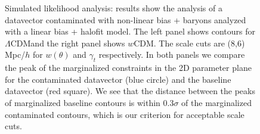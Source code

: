 \documentclass[fleqn,usenatbib]{mnras}
\newcommand{\lcdm}{$\Lambda$CDM}
\newcommand{\wcdm}{$w$CDM}
\begin{document}
\begin{figure}
\centering
{}
\hfill
{}
    \caption[]{Simulated likelihood analysis: results show the analysis of a datavector contaminated with non-linear bias + baryons analyzed with a linear bias + halofit model. The left panel   shows contours for \lcdm  and the right panel shows \wcdm. The scale cuts are (8,6) Mpc/$h$ for $w(\theta)$ and $\gamma_t$ respectively. In both panels we compare the peak of the marginalized constraints in the 2D  parameter plane for the contaminated datavector (blue circle) and the baseline datavector  (red square). We see that the distance between the peaks of marginalized baseline contours is within 0.3$\sigma$ of the marginalized contaminated contours, which is our  criterion for acceptable scale cuts. }
\end{figure}
\end{document}
